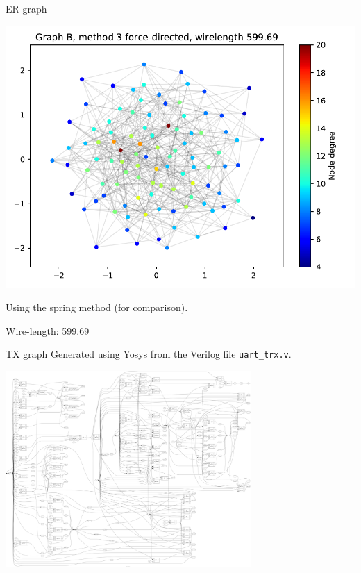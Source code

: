 \documentclass[serif, 12pt]{beamer}
\begin{document}
\begin{frame}{ER graph}
\begin{center}
\includegraphics[scale=0.5]{B/spring.pdf}
\end{center}
Using the spring method (for comparison).

Wire-length: 599.69
\end{frame}

\begin{frame}{TX graph}
Generated using Yosys \cite{wolf} from the Verilog file \texttt{uart\_trx.v}.
\begin{center}
\includegraphics[width=0.7\textwidth]{uart-small.png}
\end{center}
\end{frame}
\end{document}
